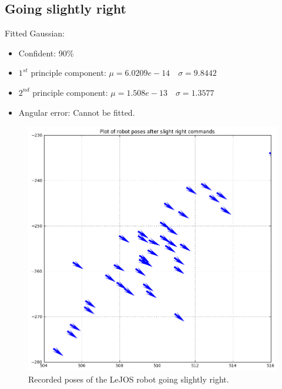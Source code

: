 \documentclass[paper=a4, fontsize=11pt]{scrartcl} %
\begin{document}
    \subsection{Going slightly right}
	    Fitted Gaussian:
	    \begin{itemize}
	       	\item Confident: 90\%
		    \item $1^{st}$ principle component: $\mu = 6.0209e-14 \quad \sigma = 9.8442$
		    \item $2^{nd}$ principle component: $\mu = 1.508e-13 \quad \sigma = 1.3577$
		    \item Angular error: Cannot be fitted.
	    \end{itemize}
    \begin{figure}[H]
        \begin{center}
            \setlength{\fboxsep}{0.5pt} %
            \setlength{\fboxrule}{0.5pt}
            \includegraphics[width=12cm,fbox]{images/poses_plot_3_slightRight.png}
            \caption{Recorded poses of the LeJOS robot going slightly right.}
        \end{center}
    \end{figure}
\end{document}
